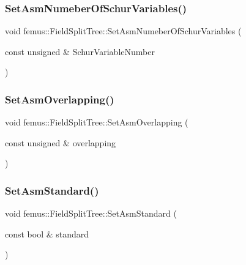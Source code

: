 \subsubsection{\texorpdfstring{Set\+Asm\+Numeber\+Of\+Schur\+Variables()}{SetAsmNumeberOfSchurVariables()}}
{\footnotesize\ttfamily void femus\+::\+Field\+Split\+Tree\+::\+Set\+Asm\+Numeber\+Of\+Schur\+Variables (\begin{DoxyParamCaption}\item[{const unsigned \&}]{Schur\+Variable\+Number }\end{DoxyParamCaption})\hspace{0.3cm}{\ttfamily [inline]}}

\mbox{\label{classfemus_1_1_field_split_tree_ae4cebadf4571701bf3f667404c2a0bbc}} 
\subsubsection{\texorpdfstring{Set\+Asm\+Overlapping()}{SetAsmOverlapping()}}
{\footnotesize\ttfamily void femus\+::\+Field\+Split\+Tree\+::\+Set\+Asm\+Overlapping (\begin{DoxyParamCaption}\item[{const unsigned \&}]{overlapping }\end{DoxyParamCaption})\hspace{0.3cm}{\ttfamily [inline]}}

\mbox{\label{classfemus_1_1_field_split_tree_a812b8a58d52a2761972ad81596411d84}} 
\subsubsection{\texorpdfstring{Set\+Asm\+Standard()}{SetAsmStandard()}}
{\footnotesize\ttfamily void femus\+::\+Field\+Split\+Tree\+::\+Set\+Asm\+Standard (\begin{DoxyParamCaption}\item[{const bool \&}]{standard }\end{DoxyParamCaption})\hspace{0.3cm}{\ttfamily [inline]}}

